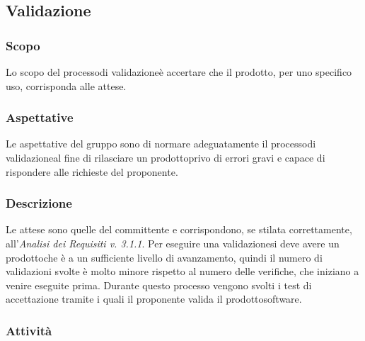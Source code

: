 \subsection{Validazione}

\subsubsection{Scopo}
Lo scopo del processo\glosp di validazione\glosp è accertare che il prodotto\glo, per uno specifico uso, corrisponda alle attese.

\subsubsection{Aspettative}
Le aspettative del gruppo sono di normare adeguatamente il processo\glosp di validazione\glosp al fine di rilasciare un prodotto\glosp privo di errori gravi e capace di rispondere alle richieste del proponente.

\subsubsection{Descrizione}
Le attese sono quelle del committente e corrispondono, se stilata correttamente, all'\textit{Analisi dei Requisiti v. 3.1.1}. 
Per eseguire una validazione\glosp si deve avere un prodotto\glosp che è a un sufficiente livello di avanzamento, quindi il numero di validazioni svolte è molto minore rispetto al numero delle verifiche, che iniziano a venire eseguite prima.
Durante questo processo vengono svolti i test di accettazione tramite i quali il proponente valida il prodotto\glosp software.

\subsubsection{Attività}
